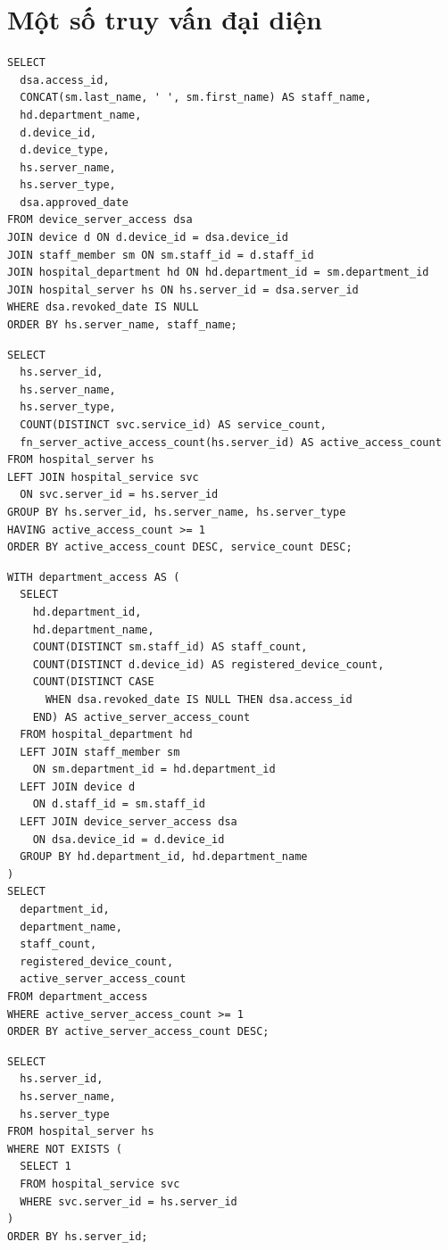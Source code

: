 \documentclass[12pt, a4paper, oneside, openany]{report}
\begin{document}
\section{Một số truy vấn đại diện}

\begin{lstlisting}[caption={Q02 - Quyền truy cập máy chủ đang active}]
SELECT
  dsa.access_id,
  CONCAT(sm.last_name, ' ', sm.first_name) AS staff_name,
  hd.department_name,
  d.device_id,
  d.device_type,
  hs.server_name,
  hs.server_type,
  dsa.approved_date
FROM device_server_access dsa
JOIN device d ON d.device_id = dsa.device_id
JOIN staff_member sm ON sm.staff_id = d.staff_id
JOIN hospital_department hd ON hd.department_id = sm.department_id
JOIN hospital_server hs ON hs.server_id = dsa.server_id
WHERE dsa.revoked_date IS NULL
ORDER BY hs.server_name, staff_name;
\end{lstlisting}

\begin{lstlisting}[caption={Q05 - Tổng hợp tải của máy chủ}]
SELECT
  hs.server_id,
  hs.server_name,
  hs.server_type,
  COUNT(DISTINCT svc.service_id) AS service_count,
  fn_server_active_access_count(hs.server_id) AS active_access_count
FROM hospital_server hs
LEFT JOIN hospital_service svc
  ON svc.server_id = hs.server_id
GROUP BY hs.server_id, hs.server_name, hs.server_type
HAVING active_access_count >= 1
ORDER BY active_access_count DESC, service_count DESC;
\end{lstlisting}

\begin{lstlisting}[caption={Q06 - CTE tổng hợp quyền truy cập active theo khoa/phòng}]
WITH department_access AS (
  SELECT
    hd.department_id,
    hd.department_name,
    COUNT(DISTINCT sm.staff_id) AS staff_count,
    COUNT(DISTINCT d.device_id) AS registered_device_count,
    COUNT(DISTINCT CASE
      WHEN dsa.revoked_date IS NULL THEN dsa.access_id
    END) AS active_server_access_count
  FROM hospital_department hd
  LEFT JOIN staff_member sm
    ON sm.department_id = hd.department_id
  LEFT JOIN device d
    ON d.staff_id = sm.staff_id
  LEFT JOIN device_server_access dsa
    ON dsa.device_id = d.device_id
  GROUP BY hd.department_id, hd.department_name
)
SELECT
  department_id,
  department_name,
  staff_count,
  registered_device_count,
  active_server_access_count
FROM department_access
WHERE active_server_access_count >= 1
ORDER BY active_server_access_count DESC;
\end{lstlisting}

\begin{lstlisting}[caption={Q10 - Máy chủ chưa host dịch vụ nào bằng NOT EXISTS}]
SELECT
  hs.server_id,
  hs.server_name,
  hs.server_type
FROM hospital_server hs
WHERE NOT EXISTS (
  SELECT 1
  FROM hospital_service svc
  WHERE svc.server_id = hs.server_id
)
ORDER BY hs.server_id;
\end{lstlisting}
\end{document}
